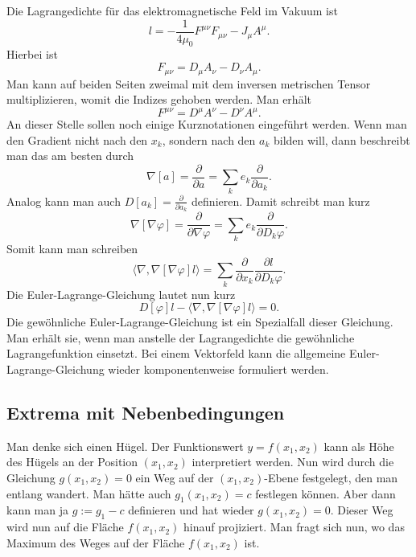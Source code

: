 \documentclass[a4paper,10pt,fleqn,twocolumn,twoside]{article}
\numberwithin{equation}{section}
\begin{document}
Die Lagrangedichte für das elektromagnetische Feld im Vakuum ist
\begin{equation}
l = -\frac{1}{4\mu_0} F^{\mu\nu}F_{\mu\nu} -J_\mu A^\mu.
\end{equation}
Hierbei ist
\begin{equation}
F_{\mu\nu} = D_\mu A_\nu - D_\nu A_\mu.
\end{equation}
Man kann auf beiden Seiten zweimal mit dem inversen metrischen
Tensor multiplizieren, womit die Indizes gehoben werden. Man erhält
\begin{equation}
F^{\mu\nu} = D^\mu A^\nu - D^\nu A^\mu.
\end{equation}
An dieser Stelle sollen noch einige Kurznotationen eingeführt werden.
Wenn man den Gradient nicht nach den $x_k$, sondern nach
den $a_k$ bilden will, dann beschreibt man das am besten durch
\begin{equation}
\nabla[a] = \frac{\partial}{\partial a}
= \sum_k e_k\frac{\partial}{\partial a_k}.
\end{equation}
Analog kann man auch $D[a_k]=\frac{\partial}{\partial a_k}$
definieren.
Damit schreibt man kurz
\begin{equation}
\nabla[\nabla\varphi] = \frac{\partial}{\partial\nabla\varphi}
= \sum_k e_k\frac{\partial}{\partial D_k\varphi}.
\end{equation}
Somit kann man schreiben
\begin{equation}
\langle\nabla,\nabla[\nabla\varphi]l\rangle
= \sum_k \frac{\partial}{\partial x_k}
\frac{\partial l}{\partial D_k\varphi}.
\end{equation}
Die Euler-Lagrange-Gleichung lautet nun kurz
\begin{equation}
D[\varphi]l-\langle\nabla,\nabla[\nabla\varphi]l\rangle=0.
\end{equation}
Die gewöhnliche Euler-Lagrange-Gleichung ist ein Spezialfall dieser
Gleichung. Man erhält sie, wenn man anstelle der Lagrangedichte
die gewöhnliche Lagrangefunktion einsetzt. Bei einem Vektorfeld
kann die allgemeine Euler-Lagrange-Gleichung wieder komponentenweise
formuliert werden.

\subsection{Extrema mit Nebenbedingungen}

Man denke sich einen Hügel. Der Funktionswert $y=f(x_1,x_2)$ kann
als Höhe des Hügels an der Position $(x_1,x_2)$ interpretiert
werden. Nun wird durch die Gleichung $g(x_1,x_2)=0$ ein Weg auf der
$(x_1,x_2)$-Ebene festgelegt, den man entlang wandert.
Man hätte auch $g_1(x_1,x_2)=c$
festlegen können. Aber dann kann man ja $g:=g_1-c$ definieren und
hat wieder $g(x_1,x_2)=0$. Dieser Weg wird nun auf die Fläche
$f(x_1,x_2)$ hinauf projiziert. Man fragt sich nun, wo das Maximum
des Weges auf der Fläche $f(x_1,x_2)$ ist.
\end{document}
